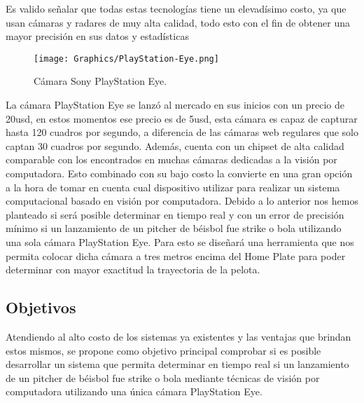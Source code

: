 Es valido señalar que todas estas tecnologías tiene un elevadísimo costo, ya que usan cámaras y radares de muy alta calidad, todo esto con el fin de obtener una mayor precisión en sus datos y estadísticas

\begin{figure}[!h]
    \centering
    \texttt{[image: Graphics/PlayStation-Eye.png]}
    \caption{Cámara Sony PlayStation Eye.}
\end{figure}

La cámara PlayStation Eye se lanzó al mercado en sus inicios con un precio de
20usd, en estos momentos ese precio es de 5usd, esta cámara es capaz de
capturar hasta 120 cuadros por segundo, a diferencia de las cámaras web
regulares que solo captan 30 cuadros por segundo. Además, cuenta con un
chipset de alta calidad comparable con los encontrados en muchas cámaras
dedicadas a la visión por computadora. Esto combinado con su bajo costo la
convierte en una gran opción a la hora de tomar en cuenta cual dispositivo utilizar
para realizar un sistema computacional basado en visión por computadora.
Debido a lo anterior nos hemos planteado si será posible determinar en tiempo
real y con un error de precisión mínimo si un lanzamiento de un pitcher de béisbol
fue strike o bola utilizando una sola cámara PlayStation Eye. Para esto se diseñará
una herramienta que nos permita colocar dicha cámara a tres metros encima del
Home Plate para poder determinar con mayor exactitud la trayectoria de la pelota.

\subsection*{Objetivos}

Atendiendo al alto costo de los sistemas ya existentes y las ventajas que brindan estos mismos, se propone como objetivo principal comprobar si es posible desarrollar un sistema que permita determinar en tiempo real si un lanzamiento de un pitcher de béisbol fue strike o bola mediante técnicas de visión por computadora utilizando una única cámara PlayStation Eye.

